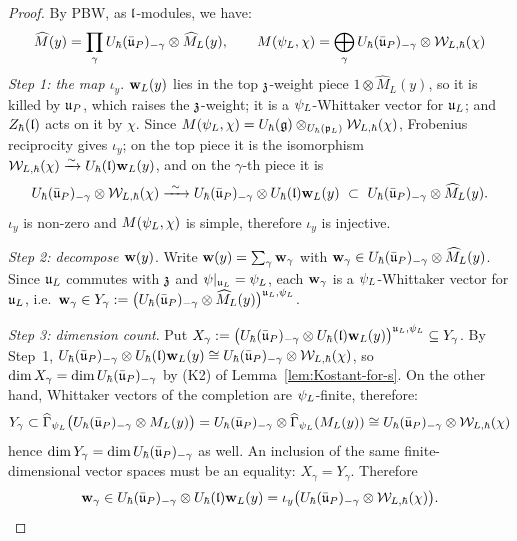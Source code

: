 \documentclass{article}
\theoremstyle{plain}
\theoremstyle{definition}
\theoremstyle{remark}
\numberwithin{equation}{section}
\begin{document}
\begin{proof}
By PBW, as $\mathfrak{l}$-modules, we have:
\begin{equation*}
    \widehat M(y)=\prod_\gamma U_\hbar(\bar{\mathfrak{u}}_P)_{-\gamma}\otimes\widehat M_L(y),\qquad
M(\psi_L, \chi)=\bigoplus_\gamma U_\hbar(\bar{\mathfrak{u}}_P)_{-\gamma}\otimes\mathcal{W}_{L,\hbar}(\chi)
\end{equation*}
\emph{Step 1: the map $\iota_y$}. $\mathbf w_L(y)$ lies in the top $\mathfrak{z}$-weight piece $1\otimes\widehat M_L(y)$, so it is killed by $\mathfrak{u}_P$, which raises the $\mathfrak{z}$-weight; it is a $\psi_L$-Whittaker vector for $\mathfrak{u}_L$; and $Z_\hbar(\mathfrak{l})$ acts on it by $\chi$. Since $M(\psi_L, \chi)=U_\hbar(\mathfrak{g})\otimes_{U_\hbar(\mathfrak{p}_L)}\mathcal{W}_{L,\hbar}(\chi)$, Frobenius reciprocity gives $\iota_y$; on the top piece it is the isomorphism $\mathcal{W}_{L,\hbar}(\chi)\xrightarrow{\sim}U_\hbar(\mathfrak{l})\mathbf w_L(y)$, and on the $\gamma$-th piece it is
\[
\Uh(\bar\fraku_P)_{-\gamma}\otimes\calW_{L,\hbar}(\chi)\xrightarrow{\ \sim\ }\Uh(\bar\fraku_P)_{-\gamma}\otimes\Uh(\frakl)\wv_L(y)\ \subset\ \Uh(\bar\fraku_P)_{-\gamma}\otimes\widehat M_L(y).
\]
$\iota_y$ is non-zero and $M(\psi_L, \chi)$ is simple, therefore $\iota_y$ is injective.

\emph{Step 2: decompose $\mathbf w(y)$}. Write $\mathbf w(y)=\sum_\gamma\mathbf w_\gamma$ with $\mathbf w_\gamma\in U_\hbar(\bar{\mathfrak{u}}_P)_{-\gamma}\otimes\widehat M_L(y)$. Since $\mathfrak{u}_L$ commutes with $\mathfrak{z}$ and $\psi|_{\mathfrak{u}_L}=\psi_L$, each $\mathbf w_\gamma$ is a $\psi_L$-Whittaker vector for $\mathfrak{u}_L$, i.e.\ $\mathbf w_\gamma\in Y_\gamma:=\bigl(U_\hbar(\bar{\mathfrak{u}}_P)_{-\gamma}\otimes\widehat M_L(y)\bigr)^{\mathfrak{u}_L,\psi_L}$.

\emph{Step 3: dimension count}. Put $X_\gamma:=\bigl(U_\hbar(\bar{\mathfrak{u}}_P)_{-\gamma}\otimes U_\hbar(\mathfrak{l})\mathbf w_L(y)\bigr)^{\mathfrak{u}_L,\psi_L}\subseteq Y_\gamma$. By Step~1, $U_\hbar(\bar{\mathfrak{u}}_P)_{-\gamma}\otimes U_\hbar(\mathfrak{l})\mathbf w_L(y)\cong U_\hbar(\bar{\mathfrak{u}}_P)_{-\gamma}\otimes\mathcal{W}_{L,\hbar}(\chi)$, so $\dim X_\gamma=\dim U_\hbar(\bar{\mathfrak{u}}_P)_{-\gamma}$ by (K2) of Lemma~\ref{lem:Kostant-for-s}. On the other hand, Whittaker vectors of the completion are $\psi_L$-finite, therefore:
\[
Y_\gamma\subset\widehat\Gamma_{\psi_L}\bigl(U_\hbar(\bar{\mathfrak{u}}_P)_{-\gamma}\otimes M_L(y)\bigr)=U_\hbar(\bar{\mathfrak{u}}_P)_{-\gamma}\otimes\widehat\Gamma_{\psi_L}(M_L(y))\cong U_\hbar(\bar{\mathfrak{u}}_P)_{-\gamma}\otimes\mathcal{W}_{L,\hbar}(\chi)
\]
hence $\dim Y_\gamma=\dim U_\hbar(\bar{\mathfrak{u}}_P)_{-\gamma}$ as well. An inclusion of the same finite-dimensional vector spaces must be an equality: $X_\gamma=Y_\gamma$. Therefore
\[
\mathbf w_\gamma\in U_\hbar(\bar{\mathfrak{u}}_P)_{-\gamma}\otimes U_\hbar(\mathfrak{l})\mathbf w_L(y)=\iota_y\bigl(U_\hbar(\bar{\mathfrak{u}}_P)_{-\gamma}\otimes\mathcal{W}_{L,\hbar}(\chi)\bigr).
\]


\end{proof}
\end{document}
